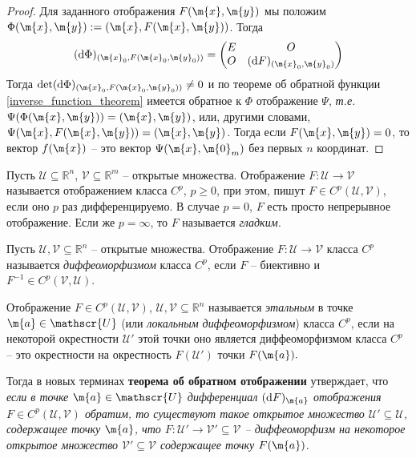 \begin{proof}
    Для заданного отображения $F(\m{x},\m{y})$ мы положим $\Phi(\m{x},\m{y}):=(\m{x}, F(\m{x},\m{y}))$. Тогда 
    \[
     (\mathrm{d}\Phi)_{(\m{x}_0, F(\m{x}_0, \m{y}_0))} = \begin{pmatrix}
         E & O \\
         O & (\mathrm{d}F)_{(\m{x}_0,\m{y}_0)}
     \end{pmatrix}
    \]
Тогда $\mathrm{det} (\mathrm{d}\Phi)_{(\m{x}_0, F(\m{x}_0, \m{y}_0))} \ne 0$ и по теореме об обратной функции \ref{inverse_function_theorem} имеется обратное к $\Phi$ отображение $\Psi$, \textit{т.е.} $\Psi(\Phi(\m{x},\m{y})) = (\m{x},\m{y})$, или, другими словами, $\Psi(\m{x}, F(\m{x},\m{y})) = (\m{x},\m{y})$. Тогда если $F(\m{x},\m{y})=0$, то вектор $f(\m{x})$ -- это вектор $\Psi(\m{x}, \m{0}_m)$ без первых $n$ координат.
\end{proof}



\begin{definition}
        Пусть $\mathscr{U}\subseteq \mathbb{R}^n$, $\mathscr{V}\subseteq \mathbb{R}^m$  -- открытые множества. Отображение $F:\mathscr{U} \to \mathscr{V}$ называется отображением класса $C^p$, $p \ge 0$, при этом, пишут $F\in C^p(\mathscr{U},\mathscr{V})$, если оно $p$ раз дифференцируемо. В случае $p=0$, $F$ есть просто непрерывное отображение. Если же $p = \infty$, то $F$ называется \textit{гладким.}
\end{definition}


\begin{definition}
    Пусть $\mathscr{U}, \mathscr{V} \subseteq \mathbb{R}^n$ -- открытые множества. Отображение $F:\mathscr{U} \to \mathscr{V}$ класса $C^p$ называется \textit{диффеоморфизмом} класса $C^p$, если $F$ -- биективно и $F^{-1} \in C^p(\mathscr{V}, \mathscr{U}).$
\end{definition}

\begin{definition}
    Отображение $F\in C^p(\mathscr{U}, \mathscr{V})$, $\mathscr{U}, \mathscr{V} \subseteq \mathbb{R}^n$ называется \textit{этальным} в точке $\m{a} \in \mathscr{U}$ (или \textit{локальным диффеоморфизмом}) класса $C^p$, если на некоторой окрестности $\mathscr{U}'$ этой точки оно является диффеоморфизмом класса $C^p$ -- это окрестности на окрестность $F(\mathscr{U'})$ точки $F(\m{a}).$
 \end{definition}

Тогда в новых терминах \textbf{теорема об обратном отображении} утверждает, что
\textit{если в точке $\m{a} \in \mathscr{U}$ дифференциал $(\mathrm{d}F)_\m{a}$ отображения $F \in C^p(\mathscr{U}, \mathscr{V})$ обратим, то существуют такое открытое множество $\mathscr{U}' \subseteq \mathscr{U}$, содержащее точку $\m{a}$, что $F:\mathscr{U}' \to \mathscr{V}' \subseteq \mathscr{V}$ -- диффеоморфизм на некоторое открытое множество $\mathscr{V}' \subseteq \mathscr{V}$ содержащее точку $F(\m{a})$.}


